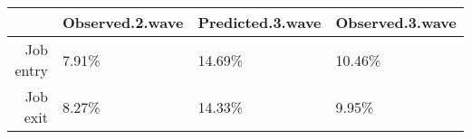 \begin{table}[ht]
\centering
\begin{tabular}{rlll}
  \hline
 & Observed.2.wave & Predicted.3.wave & Observed.3.wave \\ 
  \hline
Job entry & 7.91\% & 14.69\% & 10.46\% \\ 
  Job exit & 8.27\% & 14.33\% & 9.95\% \\ 
   \hline
\end{tabular}
\end{table}
